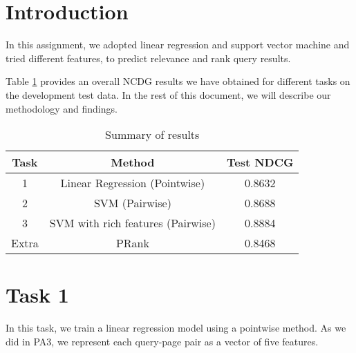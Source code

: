 
\usepackage{graphicx,amssymb,amsmath,enumerate}
\usepackage{courier}
\usepackage{color}
\usepackage{listings}
\usepackage{fancyvrb}
\usepackage{stmaryrd}

\oddsidemargin 0in
\evensidemargin 0in
\textwidth 6.5in
\topmargin -0.5in
\textheight 9.0in




\pagestyle{myheadings}  %

\section*{Introduction}
In this assignment, we adopted linear regression and support vector machine and tried different features, to predict relevance and rank query results.

Table \ref{tab:all} provides an overall NCDG results we have obtained for different tasks on the development test data.
In the rest of this document, we will describe our methodology and findings.
\begin{table}[h!]
\begin{center}
\begin{tabular}{|c|c|c|}
  \hline
  Task & Method & Test NDCG \\\hline
  1 &  Linear Regression (Pointwise) & 0.8632 \\\hline
  2 & SVM (Pairwise)  & 0.8688 \\\hline
  3 & SVM with rich features (Pairwise)  & 0.8884 \\ \hline
  Extra & PRank & 0.8468   \\\hline
\end{tabular}
\caption{Summary of results}\label{tab:all}
\end{center}
\end{table}

\section*{Task 1}
In this task, we train a linear regression model using a pointwise method.
As we did in PA3, we represent each query-page pair as a vector of five features.


